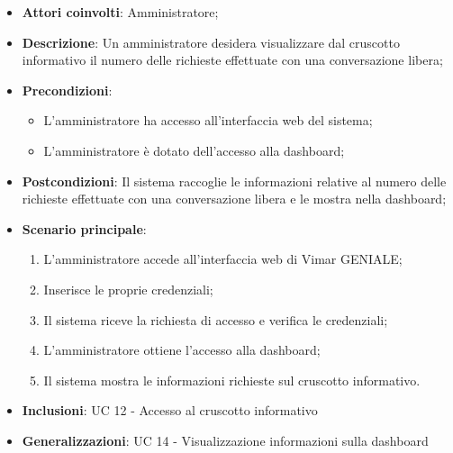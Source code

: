 \begin{itemize}
    \item \textbf{Attori coinvolti}: Amministratore;
    \item \textbf{Descrizione}: Un amministratore desidera visualizzare dal cruscotto informativo il numero delle richieste effettuate con una conversazione libera;
    \item \textbf{Precondizioni}: 
        \begin{itemize}
            \item L’amministratore ha accesso all’interfaccia web del sistema;
            \item L’amministratore è dotato dell’accesso alla dashboard;
        \end{itemize}
    \item \textbf{Postcondizioni}: Il sistema raccoglie le informazioni relative al numero delle richieste effettuate con una conversazione libera e le mostra nella dashboard;
    \item \textbf{Scenario principale}:
    \begin{enumerate}
    \item L’amministratore accede all’interfaccia web di Vimar GENIALE;
    \item Inserisce le proprie credenziali;
    \item Il sistema riceve la richiesta di accesso e verifica le credenziali;
    \item L’amministratore ottiene l’accesso alla dashboard;
    \item Il sistema mostra le informazioni richieste sul cruscotto informativo.
    \end{enumerate}
    \item \textbf{Inclusioni}: UC 12 - Accesso al cruscotto informativo
    \item \textbf{Generalizzazioni}: UC 14 - Visualizzazione informazioni sulla dashboard
\end{itemize}

